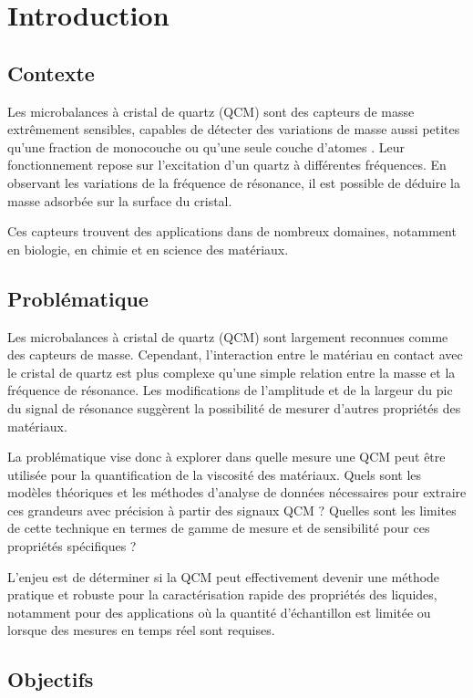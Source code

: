 \chapter{Introduction}

\section{Contexte}

Les microbalances à cristal de quartz (QCM) sont des capteurs de masse extrêmement sensibles, capables de détecter des variations de masse aussi petites qu’une fraction de monocouche ou qu’une seule couche d’atomes \cite{Boyadjiev_WO3_2007}.  
Leur fonctionnement repose sur l’excitation d'un quartz à différentes fréquences.  
En observant les variations de la fréquence de résonance, il est possible de déduire la masse adsorbée sur la surface du cristal.

Ces capteurs trouvent des applications dans de nombreux domaines, notamment en biologie, en chimie et en science des matériaux.

\section{Problématique}

Les microbalances à cristal de quartz (QCM) sont largement reconnues comme des capteurs de masse. Cependant,  
l'interaction entre le matériau en contact avec le cristal de quartz est plus complexe qu'une simple relation entre la masse et la fréquence de résonance.  
Les modifications de l'amplitude et de la largeur du pic du signal de résonance suggèrent la possibilité de mesurer d'autres propriétés des matériaux.

La problématique vise donc à explorer dans quelle mesure une QCM peut être utilisée pour la quantification de la viscosité des matériaux.  
Quels sont les modèles théoriques et les méthodes d'analyse de données nécessaires pour extraire ces grandeurs avec précision à partir des signaux QCM ?  
Quelles sont les limites de cette technique en termes de gamme de mesure et de sensibilité pour ces propriétés spécifiques ?

L'enjeu est de déterminer si la QCM peut effectivement devenir une méthode pratique et robuste pour la caractérisation rapide des propriétés des liquides,  
notamment pour des applications où la quantité d'échantillon est limitée ou lorsque des mesures en temps réel sont requises.

\section{Objectifs}


